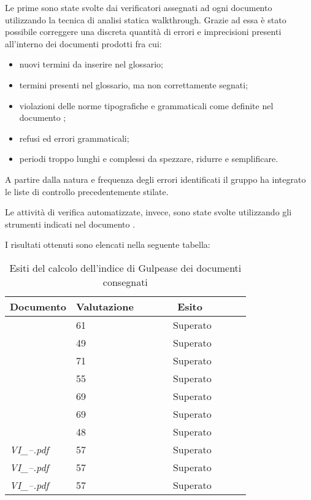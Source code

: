 		Le prime sono state svolte dai verificatori assegnati ad ogni documento utilizzando la tecnica di 					analisi statica walkthrough. Grazie ad essa è stato possibile correggere una discreta quantità di errori e imprecisioni presenti all'interno dei documenti prodotti fra cui: 
		\begin{itemize}	
			\item nuovi termini da inserire nel glossario;
			\item termini presenti nel glossario, ma non correttamente segnati;
			\item violazioni delle norme tipografiche e grammaticali come definite nel documento \NdP;
			\item refusi ed errori grammaticali;
			\item periodi troppo lunghi e complessi da spezzare, ridurre e semplificare.
		\end{itemize}
		A partire dalla natura e frequenza degli errori identificati il gruppo ha integrato le liste di controllo precedentemente stilate.

		Le attività di verifica automatizzate, invece, sono state svolte utilizzando gli strumenti indicati nel documento \NdP. 
		
		I risultati ottenuti sono elencati nella seguente tabella:
		\begin{table}[H]
		\begin{tabular}{|l|l|l|}
		\hline
		\textbf{Documento} 		&\textbf{Valutazione} &\textbf{~~~~~~Esito~~~~~~} \\
		\hline
		\PdQ 					&61		&~~~~~~Superato~~~~~~\\
		\NdP 					&49		&~~~~~~Superato~~~~~~\\
		\AdR 					&71		&~~~~~~Superato~~~~~~\\
		\PdP 					&55		&~~~~~~Superato~~~~~~\\
		\ST 					&69		&~~~~~~Superato~~~~~~\\
		\DP 					&69		&~~~~~~Superato~~~~~~\\	
		\Glossario 				&48		&~~~~~~Superato~~~~~~\\
		\textit{VI_--.pdf} 		&57		&~~~~~~Superato~~~~~~\\
		\textit{VI_--.pdf} 		&57		&~~~~~~Superato~~~~~~\\
		\textit{VI_--.pdf} 		&57		&~~~~~~Superato~~~~~~\\
		\hline
		\end{tabular}
		\caption{Esiti del calcolo dell'indice di Gulpease dei documenti consegnati}
		\end{table}
		
